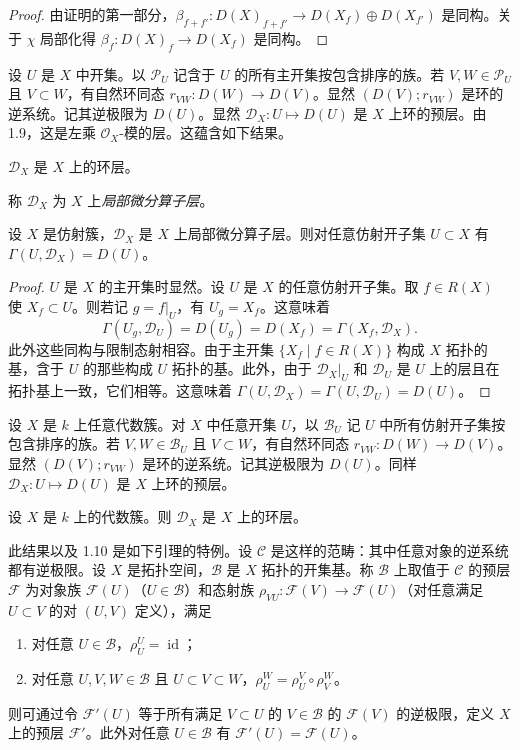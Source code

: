 \begin{proof}
由证明的第一部分，$\beta_{f+f'}:D(X)_{f+f'}\to D(X_f)\oplus D(X_{f'})$ 是同构。关于 $\chi$ 局部化得 $\beta_f:D(X)_f\to D(X_f)$ 是同构。
\end{proof}

设 $U$ 是 $X$ 中开集。以 $\mathcal{P}_U$ 记含于 $U$ 的所有主开集按包含排序的族。若 $V,W\in\mathcal{P}_U$ 且 $V\subset W$，有自然环同态 $r_{VW}:D(W)\to D(V)$。显然 $(D(V);r_{VW})$ 是环的逆系统。记其逆极限为 $D(U)$。显然 $\mathcal{D}_X:U\longmapsto D(U)$ 是 $X$ 上环的预层。由 1.9，这是左乘 $\mathcal{O}_X$-模的层。这蕴含如下结果。

\begin{proposition}
$\mathcal{D}_X$ 是 $X$ 上的环层。
\end{proposition}

称 $\mathcal{D}_X$ 为 $X$ 上\emph{局部微分算子层}。

\begin{theorem}
设 $X$ 是仿射簇，$\mathcal{D}_X$ 是 $X$ 上局部微分算子层。则对任意仿射开子集 $U\subset X$ 有 $\Gamma(U,\mathcal{D}_X)=D(U)$。
\end{theorem}

\begin{proof}
$U$ 是 $X$ 的主开集时显然。设 $U$ 是 $X$ 的任意仿射开子集。取 $f\in R(X)$ 使 $X_f\subset U$。则若记 $g=f|_U$，有 $U_g=X_f$。这意味着
$$\Gamma(U_g,\mathcal{D}_U)=D(U_g)=D(X_f)=\Gamma(X_f,\mathcal{D}_X).$$
此外这些同构与限制态射相容。由于主开集 $\{X_f\mid f\in R(X)\}$ 构成 $X$ 拓扑的基，含于 $U$ 的那些构成 $U$ 拓扑的基。此外，由于 $\mathcal{D}_X|_U$ 和 $\mathcal{D}_U$ 是 $U$ 上的层且在拓扑基上一致，它们相等。这意味着 $\Gamma(U,\mathcal{D}_X)=\Gamma(U,\mathcal{D}_U)=D(U)$。
\end{proof}

设 $X$ 是 $k$ 上任意代数簇。对 $X$ 中任意开集 $U$，以 $\mathcal{B}_U$ 记 $U$ 中所有仿射开子集按包含排序的族。若 $V,W\in\mathcal{B}_U$ 且 $V\subset W$，有自然环同态 $r_{VW}:D(W)\to D(V)$。显然 $(D(V);r_{VW})$ 是环的逆系统。记其逆极限为 $D(U)$。同样 $\mathcal{D}_X:U\longmapsto D(U)$ 是 $X$ 上环的预层。

\begin{proposition}
设 $X$ 是 $k$ 上的代数簇。则 $\mathcal{D}_X$ 是 $X$ 上的环层。
\end{proposition}

此结果以及 1.10 是如下引理的特例。设 $\mathcal{C}$ 是这样的范畴：其中任意对象的逆系统都有逆极限。设 $X$ 是拓扑空间，$\mathcal{B}$ 是 $X$ 拓扑的开集基。称 $\mathcal{B}$ 上取值于 $\mathcal{C}$ 的预层 $\mathcal{F}$ 为对象族 $\mathcal{F}(U)$（$U\in\mathcal{B}$）和态射族 $\rho_{VU}:\mathcal{F}(V)\to\mathcal{F}(U)$（对任意满足 $U\subset V$ 的对 $(U,V)$ 定义），满足
\begin{enumerate}[label=(\roman*)]
  \item 对任意 $U\in\mathcal{B}$，$\rho^U_U=\operatorname{id}$；
  \item 对任意 $U,V,W\in\mathcal{B}$ 且 $U\subset V\subset W$，$\rho^W_U=\rho^V_U\circ\rho^W_V$。
\end{enumerate}
则可通过令 $\mathcal{F}'(U)$ 等于所有满足 $V\subset U$ 的 $V\in\mathcal{B}$ 的 $\mathcal{F}(V)$ 的逆极限，定义 $X$ 上的预层 $\mathcal{F}'$。此外对任意 $U\in\mathcal{B}$ 有 $\mathcal{F}'(U)=\mathcal{F}(U)$。

